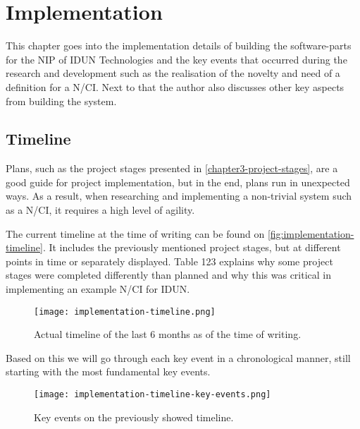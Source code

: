 \chapter{Implementation}
\graphicspath{{Chapter4/Figs/}{Chapter4/Figs/}}

This chapter goes into the implementation details of building the software-parts for the NIP of IDUN Technologies and the key events that occurred during the research and development such as the realisation of the novelty and need of a definition for a N/CI. Next to that the author also discusses other key aspects from building the system.

\section{Timeline}
\label{chapter4-timeline}

Plans, such as the project stages presented in \autoref{chapter3-project-stages}, are a good guide for project implementation, but in the end, plans run in unexpected ways. As a result, when researching and implementing a non-trivial system such as a N/CI, it requires a high level of agility.

The current timeline at the time of writing can be found on \autoref{fig:implementation-timeline}. It includes the previously mentioned project stages, but at different points in time or separately displayed. Table 123 explains why some project stages were completed differently than planned and why this was critical in implementing an example N/CI for IDUN.

\begin{figure}[!ht]
  \centering
  \texttt{[image: implementation-timeline.png]}
  \caption{Actual timeline of the last 6 months as of the time of writing.}
  \label{fig:implementation-timeline}
\end{figure}

Based on this we will go through each key event in a chronological manner, still starting with the most fundamental key events.

\begin{figure}[!ht]
  \centering
  \texttt{[image: implementation-timeline-key-events.png]}
  \caption{Key events on the previously showed timeline.}
  \label{fig:implementation-timeline-key-events}
\end{figure}


